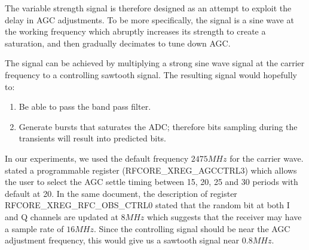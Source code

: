 The variable strength signal is therefore designed as an attempt to exploit the delay in AGC adjustments. To be more specifically, the signal is a sine wave at the working frequency which abruptly increases its strength to create a saturation, and then gradually decimates to tune down AGC. 
 
The signal can be achieved by multiplying a strong sine wave signal at the carrier frequency to a controlling sawtooth signal. The resulting signal would hopefully to:
\begin{enumerate}
	\item Be able to pass the band pass filter.
	\item Generate bursts that saturates the ADC; therefore bits sampling during the transients will result into predicted bits.
\end{enumerate}

In our experiments, we used the default frequency $2475MHz$ for the carrier wave. \cite{CC2538Manual} stated a programmable register (RFCORE\_XREG\_AGCCTRL3) which allows the user to select the AGC settle timing between 15, 20, 25 and 30 periods with default at 20. In the same document, the description of register RFCORE\_XREG\_RFC\_OBS\_CTRL0 stated that the random bit at both I and Q channels are updated at $8MHz$ which suggests that the receiver may have a sample rate of $16MHz$. Since the controlling signal should be near the AGC adjustment frequency, this would give us a sawtooth signal near $0.8MHz$.
 
%
%
%

